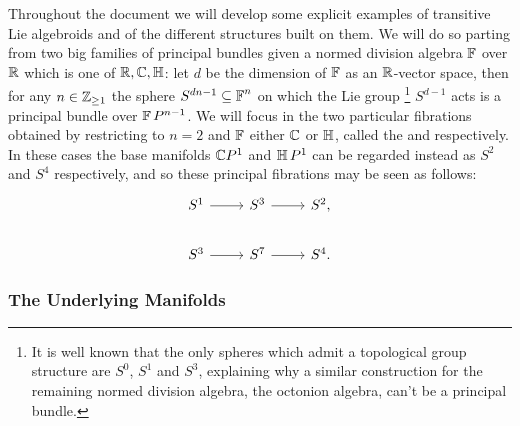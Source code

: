 Throughout the document we will develop some explicit examples of transitive Lie algebroids and of the different structures built on them.  We will do so parting from two big families of principal bundles given a normed division algebra $\operatorname{\mathbb{F}}$ over $\mathbb{R}$ which is one of $\mathbb{R}, \mathbb{C}, \operatorname{\mathbb{H}}$: let $d$ be the dimension of $\operatorname{\mathbb{F}}$ as an $\mathbb{R}$-vector space, then for any $n \in \mathbb{Z}_{\geq 1}$ the sphere $S^{dn - 1} \subseteq \operatorname{\mathbb{F}}^n$ on which the Lie group
\footnote{It is well known that the only spheres which admit a topological group structure are $S^0$, $S^1$ and $S^3$, explaining why a similar construction for the remaining normed division algebra, the octonion algebra, can't be a principal bundle.} 
$S^{d-1}$ acts is a principal bundle over $\operatorname{\mathbb{F}} P^{n-1}$. We will focus in the two particular fibrations obtained by restricting to $n = 2$ and $\operatorname{\mathbb{F}}$ either $\mathbb{C}$ or $\operatorname{\mathbb{H}}$, called the  and  respectively. In these cases the base manifolds $\mathbb{C} P^1$ and $\operatorname{\mathbb{H}} P^1$ can be regarded instead as $S^2$ and $S^4$ respectively, and so these principal fibrations may be seen as follows:
\begin{equation*}
    \begin{tikzcd}
    S^1 \arrow{r} & S^3 \arrow{r} & S^2,\\
    S^3 \arrow{r} & S^7 \arrow{r} & S^4.
    \end{tikzcd}
\end{equation*}


\subsubsection{The Underlying Manifolds}

